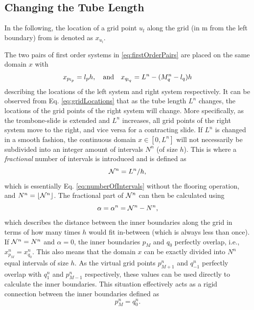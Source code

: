 \subsection{Changing the Tube Length}
In the following, the location of a grid point $u_l$ along the grid (in m from the left boundary) from is denoted as $x_{u_l}$.

The two pairs of first order systems in \eqref{eq:firstOrderPairs} are placed on the same domain $x$ with
\begin{equation}\label{eq:gridLocations}
    x_{p_{l_p}} = {l_p} h, \quad \text{and}\quad
    x_{q_{l_q}} = L^n-(M_q^n - {l_q})h
\end{equation}
describing the locations of the left system and right system respectively. It can be observed from Eq. \eqref{eq:gridLocations} that as the tube length $L^n$ changes, the locations of the grid points of the right system will change. More specifically, as the trombone-slide is extended and $L^n$ increases, all grid points of the right system move to the right, and vice versa for a contracting slide. If $L^n$ is changed in a smooth fashion, the continuous domain $x \in [0,L^n]$ will not necessarily be subdivided into an integer amount of intervals $N^n$ (of size $h$). This is where a \textit{fractional} number of intervals is introduced and is defined as 
\begin{equation}\label{eq:nfrac}
    \mathcal{N}^n = L^n/h,
\end{equation}
which is essentially Eq. \eqref{eq:numberOfIntervals} without the flooring operation, and $N^n = \lfloor \mathcal{N}^n \rfloor$. The fractional part of $\mathcal{N}^n$ can then be calculated using
\begin{equation}\label{eq:alphaDef}
    \alpha = \alpha^n = \mathcal{N}^n - N^n,
\end{equation}
which describes the distance between the inner boundaries along the grid in terms of how many times $h$ would fit in-between (which is always less than once). If $\mathcal{N}^n = N^n$ and $\alpha = 0$, the inner boundaries $p_M$ and $q_0$ perfectly overlap, i.e., $x_{p_M}^n = x_{q_0}^n$. This also means that the domain $x$ can be exactly divided into $N^n$ equal intervals of size $h$. As the virtual grid points $p_{M+1}^n$ and $q_{-1}^n$ perfectly overlap with $q_{1}^n$ and $p_{M-1}^n$ respectively, these values can be used directly to calculate the inner boundaries. This situation effectively acts as a rigid connection between the inner boundaries defined as
\begin{equation}\label{eq:rigidConn}
    p_M^n = q_0^n.
\end{equation}
